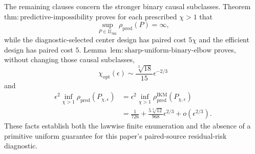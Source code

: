 The remaining clauses concern the stronger binary causal subclasses.  Theorem~\(\mathrm{thm{:}predictive\text{-}impossibility}\) proves for each prescribed \(\chi>1\) that
\[
 \sup_{P\in\mathcal U_{\mathrm{bin}}}\rho_{\mathrm{pred}}(P)=\infty,
\]
while the diagnostic-selected center design has paired cost \(5\chi\) and the efficient design has paired cost \(5\).  Lemma~\(\mathrm{lem{:}sharp\text{-}uniform\text{-}binary\text{-}elbow}\) proves, without changing those causal subclasses,
\[
 \chi_{\mathrm{opt}}(\epsilon)
 \sim\frac{\sqrt[3]{18}}{15}\epsilon^{-2/3}
\]
and
\[
\begin{aligned}
 \epsilon^2\inf_{\chi>1}\rho_{\mathrm{pred}}(P_{\chi,\epsilon})
 &=\epsilon^2\inf_{\chi>1}\rho_{\mathrm{pred}}^{\mathrm{IKM}}(P_{\chi,\epsilon})\\
 &=\frac1{726}+\frac{5\sqrt[3]{12}}{968}\epsilon^{2/3}
 +o(\epsilon^{2/3}).
\end{aligned}
\]
These facts establish both the lawwise finite enumeration and the absence of a primitive uniform guarantee for this paper's paired-source residual-risk diagnostic.